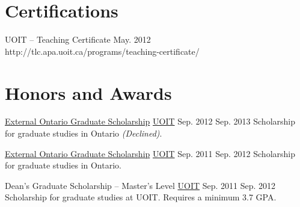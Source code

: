 
  \section{Certifications}

  \certificationEntry
    {UOIT -- Teaching Certificate }
    {May. 2012}
    {}
    {http://tlc.apa.uoit.ca/programs/teaching-certificate/}

  \section{Honors and Awards}{}

  \honorsAwardsEntry
    {\href{https://osap.gov.on.ca/OSAPPortal/en/A-ZListofAid/TCONT003465.html}{External Ontario Graduate Scholarship}}
    {\href{http://uoit.ca/}{UOIT}}
    {Sep. 2012}
    {Sep. 2013}
    {Scholarship for graduate studies in Ontario \textit{(Declined)}.}

  \honorsAwardsEntry
    {\href{https://osap.gov.on.ca/OSAPPortal/en/A-ZListofAid/TCONT003465.html}{External Ontario
Graduate Scholarship}}
    {\href{http://uoit.ca/}{UOIT}}
    {Sep. 2011}
    {Sep. 2012}
    {Scholarship for graduate studies in Ontario.}

  \honorsAwardsEntry
    {Dean's Graduate Scholarship -- Master's Level}
    {\href{http://uoit.ca/}{UOIT}}
    {Sep. 2011}
    {Sep. 2012}
    {Scholarship for graduate studies at UOIT. Requires a minimum 3.7 GPA.}


